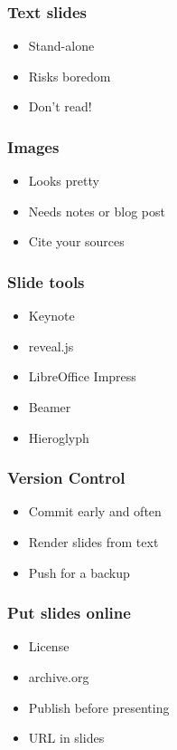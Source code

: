 \documentclass{beamer}
\begin{document}
\begin{frame}[fragile]
\tableofcontents[currentsection]
\end{frame}

\begin{frame}[fragile]
\frametitle{Text slides}
\begin{itemize}[<+(1)->]
\item Stand-alone
\item Risks boredom
\item Don't read!
\end{itemize}
\end{frame}

\begin{frame}[fragile]
\frametitle{Images}
\begin{itemize}[<+(1)->]
\item Looks pretty
\item Needs notes or blog post
\item Cite your sources
\end{itemize}
\end{frame}

\begin{frame}[fragile]
\frametitle{Slide tools}
\begin{itemize}[<+(1)->]
\item Keynote
\item reveal.js
\item LibreOffice Impress
\item Beamer
\item Hieroglyph
\end{itemize}
\end{frame}

\begin{frame}[fragile]
\frametitle{Version Control}
\begin{itemize}[<+(1)->]
\item Commit early and often
\item Render slides from text
\item Push for a backup
\end{itemize}
\end{frame}

\begin{frame}[fragile]
\frametitle{Put slides online}
\begin{itemize}[<+(1)->]
\item License
\item archive.org
\item Publish before presenting
\item URL in slides
\end{itemize}
\end{frame}
\end{document}
